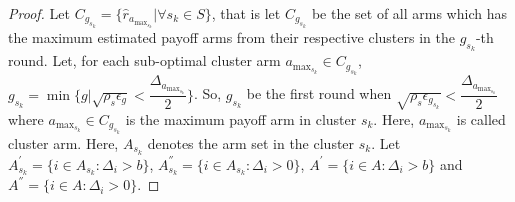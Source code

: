 \begin{proof}

Let $C_{g_{s_{k}}}=\lbrace \hat{r}_{a_{\max_{s_{k}}}} | \forall s_{k}\in S \rbrace$, that is let $C_{g_{s_{k}}}$ be the set of all arms which has the maximum estimated payoff arms from their respective clusters in the $g_{s_{k}}$-th round.  
Let, for each sub-optimal cluster arm $a_{\max_{s_{k}}}\in C_{g_{s_{k}}}$, $g_{s_{k}}=\min{\lbrace g|\sqrt{\rho_{s}\epsilon_{g}} < \dfrac{\Delta_{a_{\max_{s_{k}}}}}{2} \rbrace}$. So, $g_{s_{k}}$ be the first round when $\sqrt{\rho_{s}\epsilon_{g_{s_{k}}}} < \dfrac{\Delta_{a_{\max_{s_{k}}}}}{2}$ where $a_{\max_{s_{k}}}\in C_{g_{s_{k}}}$ is the maximum payoff arm in cluster $s_{k}$. Here, $a_{\max_{s_{k}}}$ is called cluster arm. Here, $A_{{s_{k}}}$ denotes the arm set in the cluster $s_{k}$. Let $A_{s_{k}}^{'}=\lbrace i\in A_{s_{k}}: \Delta_{i}> b\rbrace$, $A_{s_{k}}^{''}=\lbrace i\in A_{s_{k}}: \Delta_{i} > 0\rbrace$, $A^{'}=\lbrace i\in A: \Delta_{i}> b\rbrace$ and $A^{''}=\lbrace i\in A: \Delta_{i} > 0\rbrace$.


\end{proof}
